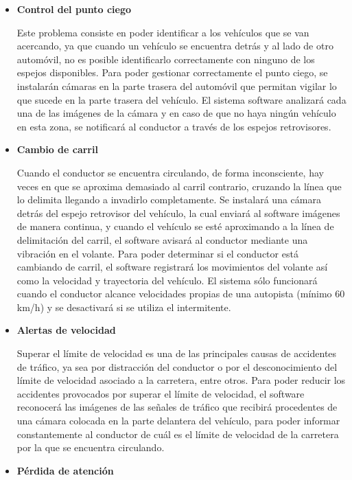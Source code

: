 \begin{itemize}[-]
\item \textbf{Control del punto ciego}
\par Este problema consiste en poder identificar a los vehículos que se van acercando, ya que cuando un vehículo se encuentra detrás y al lado de otro automóvil, no es posible identificarlo correctamente con ninguno de los espejos disponibles. Para poder gestionar correctamente el punto ciego, se instalarán cámaras en la parte trasera del automóvil que permitan vigilar lo que sucede en la parte trasera del vehículo. El sistema software analizará cada una de las imágenes de la cámara y en caso de que no haya ningún vehículo en esta zona, se notificará al conductor a través de los espejos retrovisores.
\item \textbf{Cambio de carril}
\par Cuando el conductor se encuentra circulando, de forma inconsciente, hay veces en que se aproxima demasiado al carril contrario, cruzando la línea que lo delimita llegando a invadirlo completamente. Se instalará una cámara detrás del espejo retrovisor del vehículo, la cual enviará al software imágenes de manera continua, y cuando el vehículo se esté aproximando a la línea de delimitación del carril, el software avisará al conductor mediante una vibración en el volante. Para poder determinar si el conductor está cambiando de carril, el software registrará los movimientos del volante así como la velocidad y trayectoria del vehículo. El sistema sólo funcionará cuando el conductor alcance velocidades propias de una autopista (mínimo 60 km/h) y se desactivará si se utiliza el intermitente.
\item \textbf{Alertas de velocidad}
\par Superar el límite de velocidad es una de las principales causas de accidentes de tráfico, ya sea por distracción del conductor o por el desconocimiento del límite de velocidad asociado a la carretera, entre otros. Para poder reducir los accidentes provocados por superar el límite de velocidad, el software reconocerá las imágenes de las señales de tráfico que recibirá procedentes de una cámara colocada en la parte delantera del vehículo, para poder informar constantemente al conductor de cuál es el límite de velocidad de la carretera por la que se encuentra circulando.
\item \textbf{Pérdida de atención}

\end{itemize}
